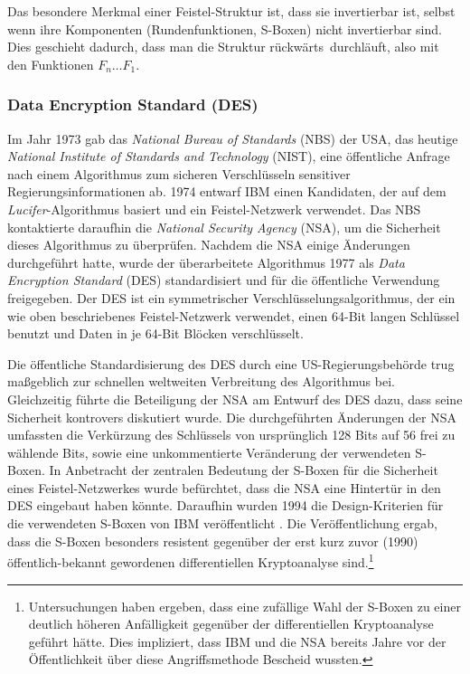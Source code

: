 Das besondere Merkmal einer Feistel-Struktur ist, dass sie invertierbar
ist, selbst wenn ihre Komponenten (Rundenfunktionen, S-Boxen) nicht
invertierbar sind. Dies geschieht dadurch, dass man die Struktur \glqq
rückwärts\grqq~durchläuft, also mit den Funktionen $F_n \dots F_1$.

\subsubsection{Data Encryption Standard (DES)}
\label{sssec:des}
Im Jahr 1973 gab das \emph{National Bureau of Standards} (NBS) der USA,
das heutige \emph{National Institute of Standards and Technology}
(NIST), eine öffentliche Anfrage nach einem Algorithmus zum sicheren
Verschlüsseln sensitiver Regierungsinformationen ab. 1974 entwarf IBM
einen Kandidaten, der auf dem \emph{Lucifer}-Algorithmus basiert und ein
Feistel-Netzwerk verwendet. Das NBS kontaktierte daraufhin die
\emph{National Security Agency} (NSA), um die Sicherheit dieses
Algorithmus zu überprüfen. Nachdem die NSA einige Änderungen
durchgeführt hatte, wurde der überarbeitete Algorithmus 1977 als
\emph{Data Encryption Standard} (DES) \indexDES \cite{NIST_DES99}
standardisiert und für die öffentliche Verwendung freigegeben. Der DES
ist ein symmetrischer Verschlüsselungsalgorithmus, der ein wie oben
beschriebenes Feistel-Netzwerk verwendet, einen 64-Bit langen Schlüssel
benutzt und Daten in je 64-Bit Blöcken verschlüsselt.  

Die öffentliche Standardisierung des DES durch eine US-Regierungsbehörde
trug maßgeblich zur schnellen weltweiten Verbreitung des Algorithmus
bei. Gleichzeitig führte die Beteiligung der NSA am Entwurf des DES
dazu, dass seine Sicherheit kontrovers diskutiert wurde. Die
durchgeführten Änderungen der NSA umfassten die Verkürzung des
Schlüssels von ursprünglich 128 Bits auf 56 frei zu wählende Bits, sowie
eine unkommentierte Veränderung der verwendeten S-Boxen. In Anbetracht
der zentralen Bedeutung der S-Boxen für die Sicherheit eines
Feistel-Netzwerkes wurde befürchtet, dass die NSA eine Hintertür in den
DES eingebaut haben könnte. Daraufhin wurden 1994 die Design-Kriterien
für die verwendeten S-Boxen von IBM veröffentlicht
\cite{Coppersmith1994}. Die Veröffentlichung ergab, dass die S-Boxen
besonders resistent gegenüber der erst kurz zuvor (1990)
öffentlich-bekannt gewordenen differentiellen Kryptoanalyse
sind.\footnote{Untersuchungen haben ergeben, dass eine zufällige Wahl
  der S-Boxen zu einer deutlich höheren Anfälligkeit gegenüber der
  differentiellen Kryptoanalyse geführt hätte. Dies impliziert, dass IBM
  und die NSA bereits Jahre vor der Öffentlichkeit über diese
  Angriffsmethode Bescheid wussten.} 

